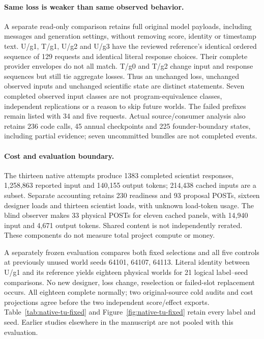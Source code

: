 \paragraph{Same loss is weaker than same observed behavior.}
A separate read-only comparison retains full original model payloads, including
messages and generation settings, without removing score, identity or timestamp
text. U/g1, T/g1, U/g2 and U/g3 have the reviewed reference's identical ordered
sequence of 129 requests and identical literal response choices. Their complete
provider envelopes do not all match. T/g0 and T/g2 change input and response
sequences but still tie aggregate losses. Thus an unchanged loss, unchanged
observed inputs and unchanged scientific state are distinct statements.
Seven completed observed input classes are not program-equivalence classes,
independent replications or a reason to skip future worlds. The failed prefixes
remain listed with 34 and five requests. Actual source/consumer analysis also
retains 236 code calls, 45 annual checkpoints and 225 founder-boundary states,
including partial evidence; seven uncommitted bundles are not completed events.

\paragraph{Cost and evaluation boundary.}
The thirteen native attempts produce 1383 completed scientist responses,
1,258,863 reported input and 140,155 output tokens; 214,438 cached inputs are a
subset. Separate accounting retains 230 readiness and 93 proposal POSTs,
sixteen designer loads and thirteen scientist loads, with unknown load-token
usage. The blind observer makes 33 physical POSTs for eleven cached panels,
with 14,940 input and 4,671 output tokens. Shared content is not independently
rerated. These components do not measure total project compute or money.

A separately frozen evaluation compares both fixed selections and all
five controls at previously unused world seeds 64101, 64107, 64113. Literal
identity between U/g1 and its reference yields eighteen physical worlds for
21 logical label--seed comparisons. No new designer, loss change, reselection
or failed-slot replacement occurs. All eighteen complete normally; two
original-source cold audits and cost projections agree before the two
independent score/effect exports. Table~\ref{tab:native-tu-fixed} and
Figure~\ref{fig:native-tu-fixed} retain every label and seed. Earlier studies
elsewhere in the manuscript are not pooled with this evaluation.

